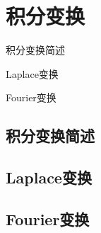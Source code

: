 \chapter{积分变换}

\begin{introduction}
    \item 积分变换简述
    \item Laplace变换
    \item Fourier变换
\end{introduction}

\section{积分变换简述}

\section{Laplace变换}

\section{Fourier变换}
